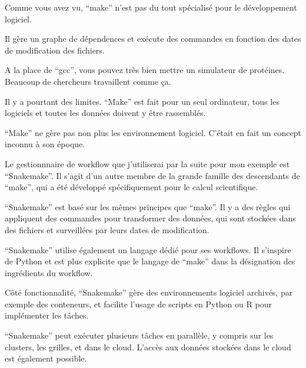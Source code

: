 \documentclass[12pt]{article}
\begin{document}
\newpage

Comme vous avez vu, ``make'' n'est pas du tout spécialisé pour le
développement logiciel.

Il gère un graphe de dépendences et exécute des commandes en fonction
des dates de modification des fichiers.

A la place de ``gcc'', vous pouvez très bien mettre un simulateur de
protéines. Beaucoup de chercheurs travaillent comme ça.

Il y a pourtant des limites. ``Make'' est fait pour un seul ordinateur,
tous les logiciels et toutes les données doivent y être rassemblés.

``Make'' ne gère pas non plus les environnement logiciel. C'était
en fait un concept inconnu à son époque.

\newpage

Le gestionnnaire de workflow que j'utiliserai par la suite pour mon
exemple est ``Snakemake''. Il s'agit d'un autre membre de la grande
famille des descendants de ``make'', qui a été développé
spécifiquement pour le calcul scientifique.

``Snakemake'' est basé sur les mêmes principes que ``make''. Il y a
des règles qui appliquent des commandes pour transformer des données,
qui sont stockées dans des fichiers et surveillées par leurs dates de
modification.

``Snakemake'' utilise également un langage dédié pour ses
workflows. Il s'inspire de Python et est plus explicite que le langage
de ``make'' dans la désignation des ingrédients du workflow.

Côté fonctionnalité, ``Snakemake'' gère des environnements logiciel
archivés, par exemple des conteneurs, et facilite l'usage de scripts
en Python ou R pour implémenter les tâches.

``Snakemake'' peut exécuter plusieurs tâches en parallèle, y compris
sur les clusters, les grilles, et dans le cloud. L'accès aux données
stockées dans le cloud est également possible.
\end{document}
